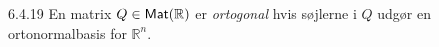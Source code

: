 %
%

\begin{definition}{6.4.19}
	En matrix $Q \in \textsf{Mat}(\mathbb{R})$ er \emph{ortogonal} hvis søjlerne i $Q$
	udgør en ortonormalbasis for $\mathbb{R}^n$.
\end{definition}
